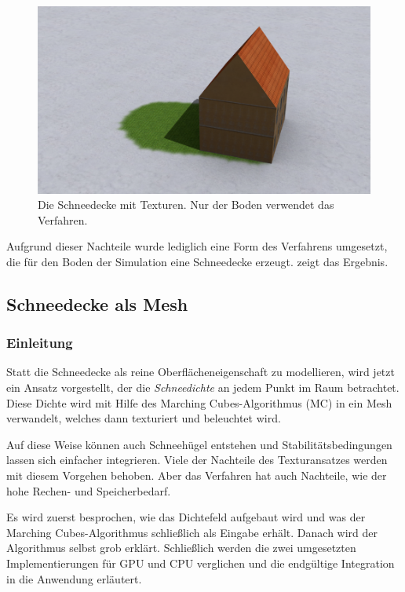 \begin{figure}[h]
\centering
\includegraphics[width=14cm]{images/snow_cover_textures}
\caption{Die Schneedecke mit Texturen. Nur der Boden verwendet das Verfahren.}
\label{fig:implementation_fallen_snow_textures}
\end{figure}

Aufgrund dieser Nachteile wurde lediglich eine Form des Verfahrens
umgesetzt, die für den Boden der Simulation eine Schneedecke
erzeugt.  zeigt das
Ergebnis.

\subsection{Schneedecke als Mesh}

\subsubsection{Einleitung}

Statt die Schneedecke als reine Oberflächeneigenschaft zu modellieren,
wird jetzt ein Ansatz vorgestellt, der die \emph{Schneedichte} an
jedem Punkt im Raum betrachtet. Diese Dichte wird mit Hilfe des
Marching Cubes-Algorithmus (MC) in ein Mesh verwandelt, welches dann
texturiert und beleuchtet wird.

Auf diese Weise können auch Schneehügel entstehen und
Stabilitätsbedingungen lassen sich einfacher integrieren. Viele der
Nachteile des Texturansatzes werden mit diesem Vorgehen behoben. Aber
das Verfahren hat auch Nachteile, wie der hohe Rechen- und
Speicherbedarf.

Es wird zuerst besprochen, wie das Dichtefeld aufgebaut wird und was
der Marching Cubes-Algorithmus schließlich als Eingabe erhält. Danach
wird der Algorithmus selbst grob erklärt. Schließlich werden die zwei
umgesetzten Implementierungen für GPU und CPU verglichen und die
endgültige Integration in die Anwendung erläutert.

